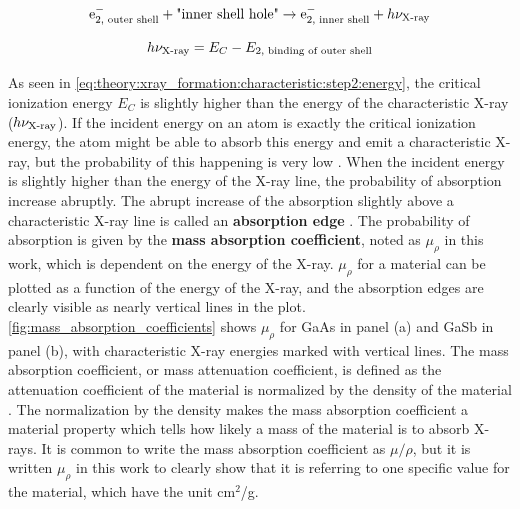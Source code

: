 \begin{equation}
    \label{eq:theory:xray_formation:characteristic:step2}
    \textnormal{e}^-_{2 {\textnormal{, outer shell}}} + \textnormal{"inner shell hole"} \rightarrow \textnormal{e}^-_{2 {\textnormal{, inner shell}}} + h\nu_{\textnormal{X-ray}}
\end{equation}


\begin{equation}
    \label{eq:theory:xray_formation:characteristic:step2:energy}
    h\nu_{\textnormal{X-ray}} = E_C - E_{2 {\textnormal{, binding of outer shell}}}
\end{equation}


As seen in \cref{eq:theory:xray_formation:characteristic:step2:energy}, the critical ionization energy $E_C$ is slightly higher than the energy of the characteristic X-ray ($h\nu_{\textnormal{X-ray}}$).
If the incident energy on an atom is exactly the critical ionization energy, the atom might be able to absorb this energy and emit a characteristic X-ray, but the probability of this happening is very low \cite{hollas_modern_2004,goldstein_scanning_2018}.
When the incident energy is slightly higher than the energy of the X-ray line, the probability of absorption increase abruptly.
The abrupt increase of the absorption slightly above a characteristic X-ray line is called an \textbf{absorption edge} \cite{goldstein_scanning_2018}.
The probability of absorption is given by the \textbf{mass absorption coefficient}, noted as $\mu_\rho$ in this work, which is dependent on the energy of the X-ray.
$\mu_\rho$ for a material can be plotted as a function of the energy of the X-ray, and the absorption edges are clearly visible as nearly vertical lines in the plot.
\cref{fig:mass_absorption_coefficients} shows $\mu_\rho$ for GaAs in panel (a) and GaSb in panel (b), with characteristic X-ray energies marked with vertical lines.
The mass absorption coefficient, or mass attenuation coefficient, is defined as the attenuation coefficient of the material is normalized by the density of the material \cite{goldstein_scanning_2018}.
The normalization by the density makes the mass absorption coefficient a material property which tells how likely a mass of the material is to absorb X-rays.
It is common to write the mass absorption coefficient as $\mu/\rho$, but it is written $\mu_\rho$ in this work to clearly show that it is referring to one specific value for the material, which have the unit cm$^2$/g.

